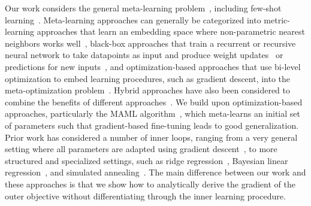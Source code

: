 \documentclass{article} \usepackage[nonatbib, final]{mod_neurips}
\begin{document}
Our work considers the general meta-learning problem~\cite{schmidhuber1987, thrun, naik}, including few-shot learning~\cite{omniglot,matchingnets}. Meta-learning approaches can generally be categorized into metric-learning approaches that learn an embedding space where non-parametric nearest neighbors works well~\cite{siameseoneshot,matchingnets,snell2017prototypical,oreshkin2018tadam,allen2019infinite}, black-box approaches that train a recurrent or recursive neural network to take datapoints as input and produce weight updates~\cite{hochreiter,andrychowicz2016learning,li2016learning,ravi2016optimization} or predictions for new inputs~\cite{mann,rl2,learningrl,munkhdalai2017meta,mishra2017simple}, and optimization-based approaches that use bi-level optimization to embed learning procedures, such as gradient descent, into the meta-optimization problem~\cite{maml,finn2018learning,bertinetto2018meta,zintgraf2018caml,metasgd,finn2018probabilistic,zhou2018deep,harrison2018meta}. Hybrid approaches have also been considered to combine the benefits of different approaches~\cite{rusu2018meta,triantafillou2019meta}.
We build upon optimization-based approaches, particularly the MAML algorithm~\cite{maml}, which meta-learns an initial set of parameters such that gradient-based fine-tuning leads to good generalization. 
Prior work has considered a number of inner loops, ranging from a very general setting where all parameters are adapted using gradient descent~\cite{maml}, to more structured and specialized settings, such as ridge regression~\cite{bertinetto2018meta}, Bayesian linear regression~\cite{harrison2018meta}, and simulated annealing~\cite{alet2018modular}.
The main difference between our work and these approaches is that we show how to analytically derive the gradient of the outer objective without differentiating through the inner learning procedure. 
\end{document}
